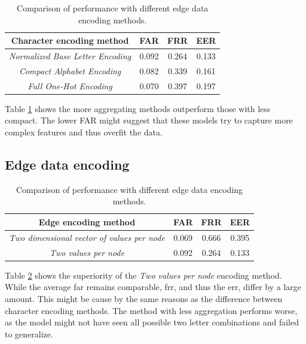 \begin{center}
	\begin{table}[H]
		\begin{center}
			\begin{tabular}{ |c|c|c|c| } 
				\hline
				Character encoding method & FAR & FRR & EER \\
				\hline
				\textit{Normalized Base Letter Encoding} & 0.092 & 0.264 & 0.133 \\
				\hline
				\textit{Compact Alphabet Encoding} & 0.082 & 0.339 & 0.161 \\
				\hline
				\textit{Full One-Hot Encoding} & 0.070 & 0.397 & 0.197 \\
				\hline
			\end{tabular}
		\end{center}
		\caption{Comparison of performance with different edge data encoding methods.}
		\label{table:char_encoding}
	\end{table}
\end{center}

Table \ref{table:char_encoding} shows the more aggregating methods outperform those with less compact. The lower FAR might suggest that these models try to capture more complex features and thus overfit the data.

\subsection{Edge data encoding}

\begin{center}
	\begin{table}[H]
		\begin{center}
			\begin{tabular}{ |c|c|c|c| } 
				\hline
				Edge encoding method & FAR & FRR & EER \\
				\hline
				\textit{Two dimensional vector of values per node} & 0.069 & 0.666 & 0.395 \\
				\hline
				\textit{Two values per node} & 0.092 & 0.264 & 0.133 \\
				\hline
			\end{tabular}
		\end{center}
		\caption{Comparison of performance with different edge data encoding methods.}
		\label{table:egde_encoding_comp}
	\end{table}
\end{center}

Table \ref{table:egde_encoding_comp} shows the superiority of the \textit{Two values per node} encoding method. While the average far remains comparable, frr, and thus the err, differ by a large amount. This might be cause by the same reasons as the difference between character encoding methods. The method with less aggregation performs worse, as the model might not have seen all possible two letter combinations and failed to generalize.



